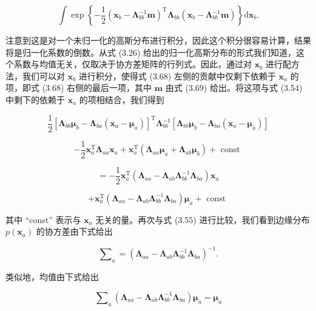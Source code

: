 \documentclass[10pt]{report}
\begin{document}
\[
\int \exp \left\{  {-\frac{1}{2}{\left( {\mathbf{x}}_{b} - {\mathbf{\Lambda }}_{bb}^{-1}\mathbf{m}\right) }^{\mathrm{T}}{\mathbf{\Lambda }}_{bb}\left( {{\mathbf{x}}_{b} - {\mathbf{\Lambda }}_{bb}^{-1}\mathbf{m}}\right) }\right\}  \mathrm{d}{\mathbf{x}}_{b}. \tag{3.70}
\]

注意到这是对一个未归一化的高斯分布进行积分，因此这个积分很容易计算，结果将是归一化系数的倒数。从式 (3.26) 给出的归一化高斯分布的形式我们知道，这个系数与均值无关，仅取决于协方差矩阵的行列式。因此，通过对 \({\mathbf{x}}_{b}\) 进行配方法，我们可以对 \({\mathbf{x}}_{b}\) 进行积分，使得式 (3.68) 左侧的贡献中仅剩下依赖于 \({\mathbf{x}}_{a}\) 的项，即式 (3.68) 右侧的最后一项，其中 \(\mathbf{m}\) 由式 (3.69) 给出。将这项与式 (3.54) 中剩下的依赖于 \({\mathbf{x}}_{a}\) 的项相结合，我们得到

\[
\frac{1}{2}{\left\lbrack  {\mathbf{\Lambda }}_{bb}{\mathbf{\mu }}_{b} - {\mathbf{\Lambda }}_{ba}\left( {\mathbf{x}}_{a} - {\mathbf{\mu }}_{a}\right) \right\rbrack  }^{\mathrm{T}}{\mathbf{\Lambda }}_{bb}^{-1}\left\lbrack  {{\mathbf{\Lambda }}_{bb}{\mathbf{\mu }}_{b} - {\mathbf{\Lambda }}_{ba}\left( {{\mathbf{x}}_{a} - {\mathbf{\mu }}_{a}}\right) }\right\rbrack
\]

\[
- \frac{1}{2}{\mathbf{x}}_{a}^{\mathrm{T}}{\mathbf{\Lambda }}_{aa}{\mathbf{x}}_{a} + {\mathbf{x}}_{a}^{\mathrm{T}}\left( {{\mathbf{\Lambda }}_{aa}{\mathbf{\mu }}_{a} + {\mathbf{\Lambda }}_{ab}{\mathbf{\mu }}_{b}}\right)  + \text{ const }
\]

\[
=  - \frac{1}{2}{\mathbf{x}}_{a}^{\mathrm{T}}\left( {{\mathbf{\Lambda }}_{aa} - {\mathbf{\Lambda }}_{ab}{\mathbf{\Lambda }}_{bb}^{-1}{\mathbf{\Lambda }}_{ba}}\right) {\mathbf{x}}_{a}
\]

\[
+ {\mathbf{x}}_{a}^{\mathrm{T}}\left( {{\mathbf{\Lambda }}_{aa} - {\mathbf{\Lambda }}_{ab}{\mathbf{\Lambda }}_{bb}^{-1}{\mathbf{\Lambda }}_{ba}}\right) {\mathbf{\mu }}_{a} + \text{ const } \tag{3.71}
\]

其中 “const” 表示与 \({\mathbf{x}}_{a}\) 无关的量。再次与式 (3.55) 进行比较，我们看到边缘分布 \(p\left( {\mathbf{x}}_{a}\right)\) 的协方差由下式给出

\[
{\mathbf{\sum }}_{a} = {\left( {\mathbf{\Lambda }}_{aa} - {\mathbf{\Lambda }}_{ab}{\mathbf{\Lambda }}_{bb}^{-1}{\mathbf{\Lambda }}_{ba}\right) }^{-1}. \tag{3.72}
\]

类似地，均值由下式给出

\[
{\mathbf{\sum }}_{a}\left( {{\mathbf{\Lambda }}_{aa} - {\mathbf{\Lambda }}_{ab}{\mathbf{\Lambda }}_{bb}^{-1}{\mathbf{\Lambda }}_{ba}}\right) {\mathbf{\mu }}_{a} = {\mathbf{\mu }}_{a} \tag{3.73}
\]
\end{document}
